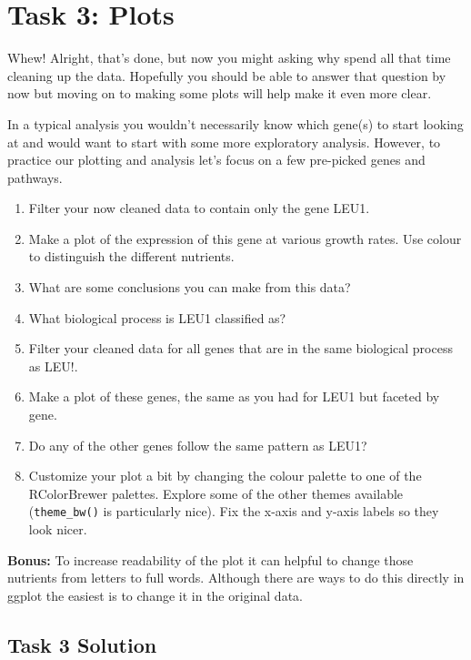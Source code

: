 \documentclass[
]{book}
\providecommand{\tightlist}{%
  \setlength{\itemsep}{0pt}\setlength{\parskip}{0pt}}
\begin{document}
\section*{Task 3: Plots}\label{task-3-plots}

Whew! Alright, that's done, but now you might asking why spend all that time cleaning up the data. Hopefully you should be able to answer that question by now but moving on to making some plots will help make it even more clear.

In a typical analysis you wouldn't necessarily know which gene(s) to start looking at and would want to start with some more exploratory analysis. However, to practice our plotting and analysis let's focus on a few pre-picked genes and pathways.

\begin{enumerate}
\def\labelenumi{\arabic{enumi}.}
\tightlist
\item
  Filter your now cleaned data to contain only the gene LEU1.
\item
  Make a plot of the expression of this gene at various growth rates. Use colour to distinguish the different nutrients.
\item
  What are some conclusions you can make from this data?
\item
  What biological process is LEU1 classified as?
\item
  Filter your cleaned data for all genes that are in the same biological process as LEU!.
\item
  Make a plot of these genes, the same as you had for LEU1 but faceted by gene.
\item
  Do any of the other genes follow the same pattern as LEU1?\\
\item
  Customize your plot a bit by changing the colour palette to one of the RColorBrewer palettes. Explore some of the other themes available (\texttt{theme\_bw()} is particularly nice). Fix the x-axis and y-axis labels so they look nicer.
\end{enumerate}

\textbf{Bonus:} To increase readability of the plot it can helpful to change those nutrients from letters to full words. Although there are ways to do this directly in ggplot the easiest is to change it in the original data.

\subsection*{Task 3 Solution}\label{task-3-solution}
\end{document}
